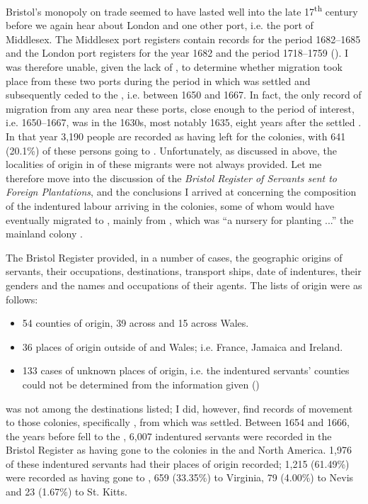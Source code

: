 Bristol's monopoly on trade seemed to have lasted well into the late 17\textsuperscript{th} century before we again hear about London and one other port, i.e. the port of Middlesex. The Middlesex port registers contain records for the period 1682--1685 and the London port registers for the year 1682 and the period 1718--1759 (\citeauthor{vcdhb}). I was therefore unable, given the lack of , to determine whether migration took place from these two ports during the period in which  was settled and subsequently ceded to the , i.e. between 1650 and 1667. In fact, the only record of migration from any area near these ports, close enough to the period of interest, i.e. 1650--1667, was in the 1630s, most notably 1635, eight years after the  settled . In that year 3,190 people are recorded as having left for the colonies, with 641 (20.1\%) of these persons going to  \citep{Menard06}. Unfortunately, as discussed in  above, the localities of origin in  of these migrants were not always provided. Let me therefore move into the discussion of the \emph{Bristol Register of Servants sent to Foreign Plantations}, and the conclusions I arrived at concerning the composition of the indentured labour arriving in the colonies, some of whom would have eventually migrated to , mainly from , which was ``a nursery for planting ...'' the mainland colony \citep[no. 130]{Sainsbury80}.

The Bristol Register provided, in a number of cases, the geographic origins of servants, their occupations, destinations, transport ships, date of indentures, their genders and the names and occupations of their agents. The lists of origin were as follows:

\begin{itemize}
\item{54 counties of origin, 39 across  and 15 across Wales.}
\item{36 places of origin outside of  and Wales; i.e. France, Jamaica and Ireland.}
\item{133 cases of unknown places of origin, i.e. the indentured servants' counties could not be determined from the information given (\citeauthor{vcdh})}
\end{itemize}

 was not among the destinations listed; I did, however, find records of movement to those colonies, specifically , from which  was settled. Between 1654 and 1666, the years before  fell to the , 6,007 indentured servants were recorded in the Bristol Register as having gone to the  colonies in the  and North America. 1,976 of these indentured servants had their places of origin recorded; 1,215 (61.49\%) were recorded as having gone to , 659 (33.35\%) to Virginia, 79 (4.00\%) to Nevis and 23 (1.67\%) to St. Kitts.

